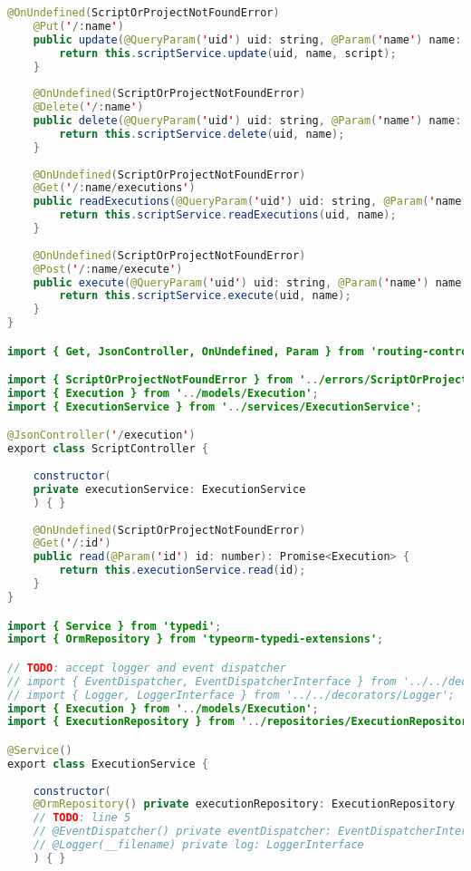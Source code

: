 \begin{lstlisting}[language=java]
	@OnUndefined(ScriptOrProjectNotFoundError)
	@Put('/:name')
	public update(@QueryParam('uid') uid: string, @Param('name') name: string, @Body() script: Script): Promise<Script> {
		return this.scriptService.update(uid, name, script);
	}
	
	@OnUndefined(ScriptOrProjectNotFoundError)
	@Delete('/:name')
	public delete(@QueryParam('uid') uid: string, @Param('name') name: string): Promise<Script> {
		return this.scriptService.delete(uid, name);
	}
	
	@OnUndefined(ScriptOrProjectNotFoundError)
	@Get('/:name/executions')
	public readExecutions(@QueryParam('uid') uid: string, @Param('name') name: string): Promise<Execution> {
		return this.scriptService.readExecutions(uid, name);
	}
	
	@OnUndefined(ScriptOrProjectNotFoundError)
	@Post('/:name/execute')
	public execute(@QueryParam('uid') uid: string, @Param('name') name: string): Promise<Script> {
		return this.scriptService.execute(uid, name);
	}
}

import { Get, JsonController, OnUndefined, Param } from 'routing-controllers';

import { ScriptOrProjectNotFoundError } from '../errors/ScriptOrProjectNotFoundError';
import { Execution } from '../models/Execution';
import { ExecutionService } from '../services/ExecutionService';

@JsonController('/execution')
export class ScriptController {
	
	constructor(
	private executionService: ExecutionService
	) { }
	
	@OnUndefined(ScriptOrProjectNotFoundError)
	@Get('/:id')
	public read(@Param('id') id: number): Promise<Execution> {
		return this.executionService.read(id);
	}
}

import { Service } from 'typedi';
import { OrmRepository } from 'typeorm-typedi-extensions';

// TODO: accept logger and event dispatcher
// import { EventDispatcher, EventDispatcherInterface } from '../../decorators/EventDispatcher';
// import { Logger, LoggerInterface } from '../../decorators/Logger';
import { Execution } from '../models/Execution';
import { ExecutionRepository } from '../repositories/ExecutionRepository';

@Service()
export class ExecutionService {
	
	constructor(
	@OrmRepository() private executionRepository: ExecutionRepository
	// TODO: line 5
	// @EventDispatcher() private eventDispatcher: EventDispatcherInterface,
	// @Logger(__filename) private log: LoggerInterface
	) { }
	

\end{lstlisting}
